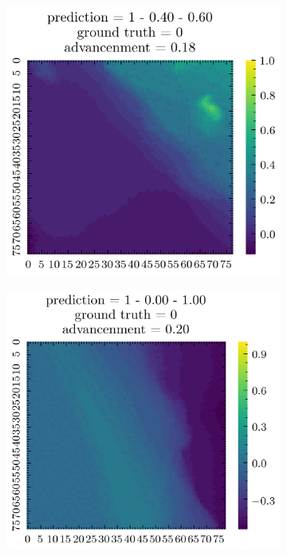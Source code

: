 \begin{figure}[H]
    \centering
    \begin{subfigure}[b]{0.19\textwidth}
        \includegraphics[width=\linewidth]{../img/5/quarry/false_negative/patch-2d-0.png}
    \end{subfigure}
    \begin{subfigure}[b]{0.19\textwidth}
        \includegraphics[width=\linewidth]{../img/5/quarry/false_negative/patch-2d-1.png}

\end{subfigure}
\end{figure}
